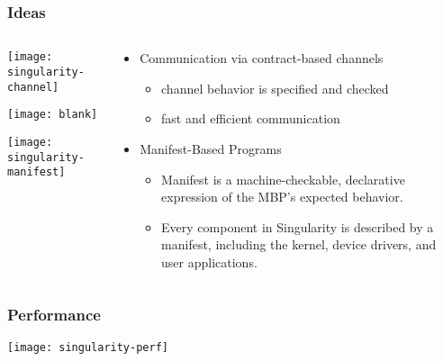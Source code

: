 \begin{frame}[plain]
	\frametitle{Ideas}
	
	
	
	\begin{columns}
		
		\begin{column}{.5\textwidth}
			
			\texttt{[image: singularity-channel]}
			
			\texttt{[image: blank]}
						
			\texttt{[image: singularity-manifest]}
			
		\end{column}
		
		\begin{column}{.5\textwidth}
			
			\begin{itemize}
				
				\item Communication via contract-based channels
				
				\begin{itemize}
					\item  channel behavior is specified and checked
					\item fast and efficient communication
					
				\end{itemize} 
				
				
				\item  Manifest-Based Programs
				
				\begin{itemize}
					\item  Manifest is a machine-checkable,
					declarative expression of the MBP's expected behavior. 
					\item  Every component in Singularity is described by a manifest,
					including the kernel, device drivers, and user applications. 
				\end{itemize} 
				
			\end{itemize}	
			
		\end{column}
		
		
	\end{columns}
	
	
\end{frame}




\begin{frame}[plain]
	\frametitle{Performance}
	
	\centering
	\texttt{[image: singularity-perf]}
	
\end{frame}



